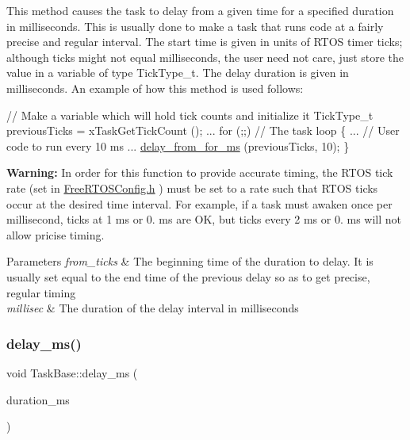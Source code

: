 This method causes the task to delay from a given time for a specified duration in milliseconds. This is usually done to make a task that runs code at a fairly precise and regular interval. The start time is given in units of R\+T\+OS timer ticks; although ticks might not equal milliseconds, the user need not care, just store the value in a variable of type {\ttfamily Tick\+Type\+\_\+t}. The delay duration is given in milliseconds. An example of how this method is used follows\+: 
\begin{DoxyCode}
\textcolor{comment}{// Make a variable which will hold tick counts and initialize it}
TickType\_t previousTicks = xTaskGetTickCount ();
...
for (;;)                   \textcolor{comment}{// The task loop}
\{
    ...                    \textcolor{comment}{// User code to run every 10 ms}
    ...
    \mbox{\hyperlink{class_task_base_a31b1c01059c7ec4bfe60fc8332759551}{delay\_from\_for\_ms}} (previousTicks, 10);
\}
\end{DoxyCode}
 {\bfseries Warning\+:} In order for this function to provide accurate timing, the R\+T\+OS tick rate (set in {\ttfamily \mbox{\hyperlink{_free_r_t_o_s_config_8h_source}{Free\+R\+T\+O\+S\+Config.\+h}}} ) must be set to a rate such that R\+T\+OS ticks occur at the desired time interval. For example, if a task must awaken once per millisecond, ticks at 1 ms or 0. ms are OK, but ticks every 2 ms or 0. ms will not allow pricise timing. 
\begin{DoxyParams}{Parameters}
{\em from\+\_\+ticks} & The beginning time of the duration to delay. It is usually set equal to the end time of the previous delay so as to get precise, regular timing \\
\hline
{\em millisec} & The duration of the delay interval in milliseconds \\
\hline
\end{DoxyParams}
\mbox{\label{class_task_base_a6a7e9bc3d85a0e71462002b85402d995}} 
\subsubsection{\texorpdfstring{delay\+\_\+ms()}{delay\_ms()}}
{\footnotesize\ttfamily void Task\+Base\+::delay\+\_\+ms (\begin{DoxyParamCaption}\item[{Tick\+Type\+\_\+t}]{duration\+\_\+ms }\end{DoxyParamCaption})\hspace{0.3cm}{\ttfamily [inline]}}



